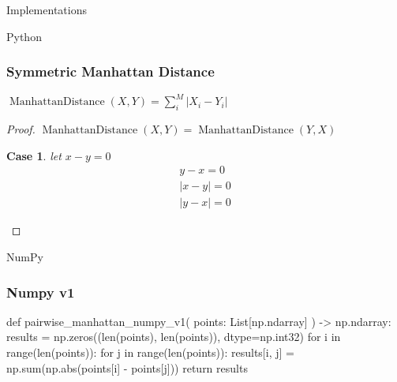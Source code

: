 \documentclass{beamer}
\theoremstyle{case}
\newtheorem{case}{Case}
\DeclareMathOperator{\md}{Manhattan Distance}
\begin{document}
\begin{section}{Implementations}
\begin{subsection}{Python}
\begin{frame}
    \frametitle{Symmetric Manhattan Distance}
    \begin{center}
    $\md(X, Y) = \sum_i^M | X_i - Y_i |$
    \end{center}
    \begin{proof}
        $\md(X, Y) = \md(Y,X)$
        \begin{case}
            let $x - y = 0$
            \begin{align*}
                y - x = 0 \\
                |x - y| = 0 \\
                |y - x| = 0
            \end{align*}
        \end{case}
    \end{proof}
\end{frame}


\end{subsection} %

\begin{subsection}{NumPy}

\begin{frame}[fragile]
    \frametitle{Numpy v1}

    \begin{pythoncode}
def pairwise_manhattan_numpy_v1(
    points: List[np.ndarray]
) -> np.ndarray:
    results = np.zeros((len(points), len(points)), dtype=np.int32)
    for i in range(len(points)):
        for j in range(len(points)):
            results[i, j] = np.sum(np.abs(points[i] - points[j]))
    return results
    \end{pythoncode}
\end{frame}


\end{subsection}
\end{section}
\end{document}
